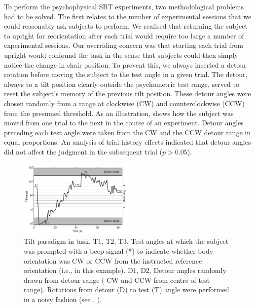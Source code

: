 To perform the psychophysical SBT experiments, two methodological problems had to be solved. The first relates to the number of experimental sessions that we could reasonably ask subjects to perform. We realised that returning the subject to upright for reorientation after each trial would require too large a number of experimental sessions. Our overriding concern was that starting each trial from upright would confound the  task in the sense that subjects could then simply notice the change in chair position. To prevent this, we always inserted a detour rotation before moving the subject to the test angle in a given trial. The detour, always to a tilt position clearly outside the psychometric test range, served to reset the subject's memory of the previous tilt position. These detour angles were chosen randomly from a range at  clockwise (CW) and counterclockwise (CCW) from the presumed threshold. As an illustration,  shows how the subject was moved from one trial to the next in the course of an  experiment. Detour angles preceding each test angle were taken from the CW and the CCW detour range in equal proportions. An analysis of trial history effects indicated that detour angles did not affect the judgment in the subsequent trial ($p > 0.05$). 

\begin{figure}    
    \includegraphics[width=0.5\textwidth]{src/paper1/figure2.pdf}
    
    \caption{Tilt paradigm in  task. T1, T2, T3, Test angles at which the subject was prompted with a beep signal (*) to indicate whether body orientation was CW or CCW from the instructed reference orientation (i.e.,  in this example). D1, D2, Detour angles randomly drawn from detour range ( CW and CCW from centre of test range). Rotations from detour (D) to test (T) angle were performed in a noisy fashion (see , ).}
    \label{p1:fig2}
\end{figure}

